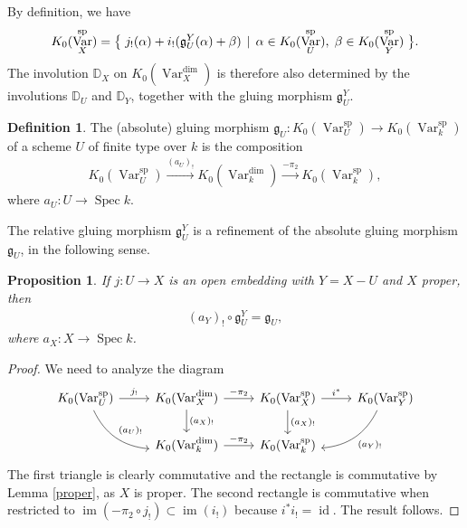 \documentclass{amsart}
\newtheorem{prop}[thm]{Proposition}
\theoremstyle{definition}
\newtheorem{defn}[thm]{Definition}
\DeclareMathOperator{\im}{im}
\DeclareMathOperator{\Var}{Var}
\DeclareMathOperator{\spr}{sp}
\DeclareMathOperator{\id}{id}
\newcommand{\Kdim}{K_0(\Var_k^{\dim})}
\newcommand{\Kspr}{K_0(\Var_k^{\spr})}
\numberwithin{equation}{section}
\begin{document}
By definition, we have
\begin{align*}
    K_0(\Var_X^{\spr}) = \big\{ \hspace{.1cm} j_!(\alpha) + i_!(\mathfrak{g}_U^Y(\alpha) + \beta) \hspace{.15cm} | \hspace{.15cm} \alpha \in K_0(\Var_U^{\spr}), \hspace{.1cm} \beta \in K_0(\Var_Y^{\spr}) \hspace{.1cm} \big\}.
\end{align*}
The involution $\mathbb{D}_X$ on $K_0(\Var_X^{\dim})$ is therefore also determined by the involutions $\mathbb{D}_U$ and $\mathbb{D}_Y$, together with the gluing morphism $\mathfrak{g}_{U}^Y$.


\begin{defn}
The (absolute) gluing morphism $\mathfrak{g}_U: K_0(\Var_U^{\spr}) \rightarrow K_0(\Var_k^{\spr})$ of a scheme $U$ of finite type over $k$ is the composition
\begin{align*}
    K_0(\Var_U^{\spr}) \xrightarrow[]{(a_U)_!} \Kdim \xrightarrow[]{-\pi_2} \Kspr,
\end{align*}
where $a_U:U \rightarrow \mathop{\mathrm{Spec}}k$.
\end{defn}

The relative gluing morphism $\mathfrak{g}_U^Y$ is a refinement of the absolute gluing morphism $\mathfrak{g}_U$, in the following sense.

\begin{prop}\label{gluing refinement}
If $j:U \rightarrow X$ is an open embedding with $Y = X-U$ and $X$ proper, then
\begin{align*}
    (a_Y)_! \circ \mathfrak{g}_U^Y = \mathfrak{g}_U,
\end{align*}
where $a_X: X \rightarrow \mathop{\mathrm{Spec}}k$.
\end{prop}

\begin{proof}
We need to analyze the diagram
\[
\begin{tikzcd}
  K_0(\Var_U^{\spr}) \arrow[r, "j_!"] \arrow[dr,bend right, "(a_U)_!"] & K_0(\Var_X^{\dim}) \arrow[r, "-\pi_2"] \arrow[d, "(a_X)_!"] & K_0(\Var_X^{\spr}) \arrow[r, "i^*"] \arrow[d, "(a_X)_!"] & K_0(\Var_Y^{\spr}) \arrow[dl, bend left, "(a_Y)_!"] \\
  & \Kdim \arrow[r, "-\pi_2"] & \Kspr
\end{tikzcd}
\]
The first triangle is clearly commutative and the rectangle is commutative by Lemma \ref{proper}, as $X$ is proper. The second rectangle is commutative when restricted to $\im( -\pi_2 \circ j_!) \subset \im(i_!)$ because $i^* i_! = \id$. The result follows.
\end{proof}
\end{document}
